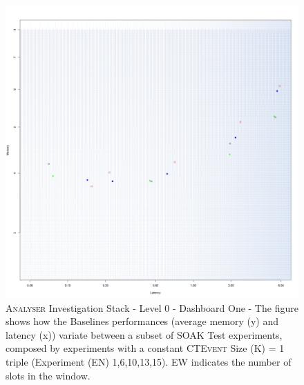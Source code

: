 \begin{figure}[h!tb]
	\centering
	\includegraphics[width=0.85\linewidth]{images/dashboard-1}	
	\caption[\textsc{Analyser} Investigation Stack - Level 0 - Dashboard One - Multiplot Version]{\textsc{Analyser} Investigation Stack - Level 0 - Dashboard One - The figure shows how the Baselines performances (average memory (y) and latency (x)) variate between a subset of SOAK Test experiments, composed by experiments with a constant \textsc{CTEvent} Size (K) = 1 triple (Experiment (EN) 1,6,10,13,15). EW indicates the number of slots in the window.} 
	\label{fig:result_dashboard_kb}
\end{figure}

